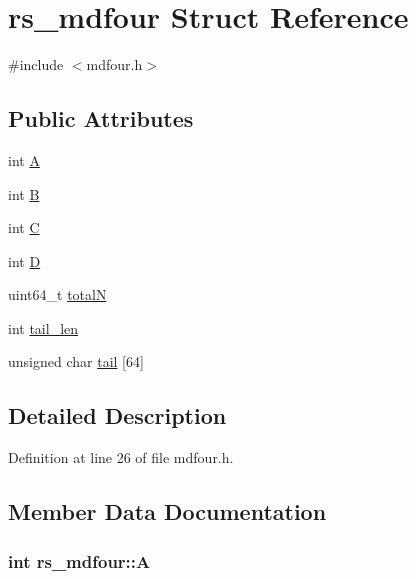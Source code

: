 \hypertarget{structrs__mdfour}{}\section{rs\+\_\+mdfour Struct Reference}
\label{structrs__mdfour}


{\ttfamily \#include $<$mdfour.\+h$>$}

\subsection*{Public Attributes}
\begin{DoxyCompactItemize}
\item 
int \hyperlink{structrs__mdfour_a51e2f4a76e49ef07ab13fbee4c865bbf}{A}
\item 
int \hyperlink{structrs__mdfour_a528e4b2a18f4c1a8438ba472b219f7af}{B}
\item 
int \hyperlink{structrs__mdfour_a9e9e03370852b661218170ba16088726}{C}
\item 
int \hyperlink{structrs__mdfour_a22ab9b9509cab3d712ef8cf5690ff9bb}{D}
\item 
uint64\+\_\+t \hyperlink{structrs__mdfour_a9920c8f53c56ac1feacd4a40c18d939e}{total\+N}
\item 
int \hyperlink{structrs__mdfour_a8c0d1c9166566478913b96aa9b6831da}{tail\+\_\+len}
\item 
unsigned char \hyperlink{structrs__mdfour_a207f0a66c953b28cfb3c4565b3c66259}{tail} \mbox{[}64\mbox{]}
\end{DoxyCompactItemize}


\subsection{Detailed Description}


Definition at line 26 of file mdfour.\+h.



\subsection{Member Data Documentation}
\hypertarget{structrs__mdfour_a51e2f4a76e49ef07ab13fbee4c865bbf}{}
\subsubsection[{A}]{\setlength{\rightskip}{0pt plus 5cm}int rs\+\_\+mdfour\+::\+A}\label{structrs__mdfour_a51e2f4a76e49ef07ab13fbee4c865bbf}


